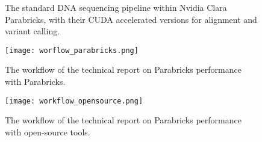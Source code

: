 \documentclass[conference]{IEEEtran}
\begin{document}


\begin{figure}
    \centering
    \caption{The standard DNA sequencing pipeline within Nvidia Clara Parabricks, with their CUDA accelerated versions for alignment and variant calling.}
    \label{fig:enter-label}
\end{figure}


\begin{figure}
    \centering
    \texttt{[image: worflow\_parabricks.png]}
    \caption{The workflow of the technical report on Parabricks performance with Parabricks.}
    \label{fig:your_label}
\end{figure}





\begin{figure}
    \centering
    \texttt{[image: workflow\_opensource.png]}
    \caption{The workflow of the technical report on Parabricks performance with open-source tools.}
    \label{fig:your_label}
\end{figure}
\end{document}
